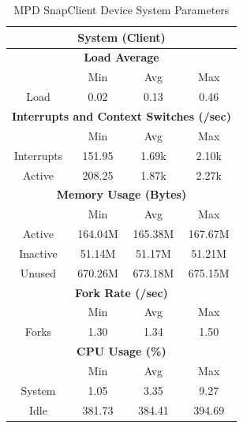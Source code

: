 \documentclass[11pt,a4paper,headinclude=false,footinclude=false]{scrreprt}
\begin{document}
\begin{table}[H]
\centering
    \begin{tabular}{||c|c|c|c|c|c|c||}
    \hline
    \multicolumn{7}{|c|}{\textbf{System (Client)}} \\
    \hline
    \multicolumn{7}{|c|}{\textbf{Load Average}} \\
    \hline\hline
      & \multicolumn{2}{|c|}{Min} & \multicolumn{2}{|c|}{Avg} & \multicolumn{2}{|c|}{Max} \\
    \hline
    Load & \multicolumn{2}{|c|}{0.02} & \multicolumn{2}{|c|}{0.13} & \multicolumn{2}{|c|}{0.46} \\
    \hline\hline
    \multicolumn{7}{|c|}{\textbf{Interrupts and Context Switches (/sec)}} \\
    \hline
      & \multicolumn{2}{|c|}{Min} & \multicolumn{2}{|c|}{Avg} & \multicolumn{2}{|c|}{Max} \\
    \hline
    Interrupts & \multicolumn{2}{|c|}{151.95} & \multicolumn{2}{|c|}{1.69k} & \multicolumn{2}{|c|}{2.10k} \\
    \hline
    Active & \multicolumn{2}{|c|}{208.25} & \multicolumn{2}{|c|}{1.87k} & \multicolumn{2}{|c|}{2.27k} \\
    \hline\hline
    \multicolumn{7}{|c|}{\textbf{Memory Usage (Bytes)}} \\
    \hline\hline
      & \multicolumn{2}{|c|}{Min} & \multicolumn{2}{|c|}{Avg} & \multicolumn{2}{|c|}{Max} \\
    \hline
    Active & \multicolumn{2}{|c|}{164.04M} & \multicolumn{2}{|c|}{165.38M} & \multicolumn{2}{|c|}{167.67M} \\
    \hline
    Inactive & \multicolumn{2}{|c|}{51.14M} & \multicolumn{2}{|c|}{51.17M} & \multicolumn{2}{|c|}{51.21M} \\
    \hline
    Unused & \multicolumn{2}{|c|}{670.26M} & \multicolumn{2}{|c|}{673.18M} & \multicolumn{2}{|c|}{675.15M} \\
    \hline\hline
    \multicolumn{7}{|c|}{\textbf{Fork Rate (/sec)}} \\
    \hline\hline
      & \multicolumn{2}{|c|}{Min} & \multicolumn{2}{|c|}{Avg} & \multicolumn{2}{|c|}{Max} \\
    \hline
    Forks & \multicolumn{2}{|c|}{1.30} & \multicolumn{2}{|c|}{1.34} & \multicolumn{2}{|c|}{1.50} \\
    \hline\hline
    \multicolumn{7}{|c|}{\textbf{CPU Usage (\%)}} \\
    \hline\hline
      & \multicolumn{2}{|c|}{Min} & \multicolumn{2}{|c|}{Avg} & \multicolumn{2}{|c|}{Max} \\
    \hline
    System & \multicolumn{2}{|c|}{1.05} & \multicolumn{2}{|c|}{3.35} & \multicolumn{2}{|c|}{9.27} \\
    \hline
    Idle & \multicolumn{2}{|c|}{381.73} & \multicolumn{2}{|c|}{384.41} & \multicolumn{2}{|c|}{394.69} \\
    \hline\hline
    \end{tabular}
    \caption{MPD SnapClient Device System Parameters}
    \label{MPDclientSysTab}
\end{table}
\end{document}
